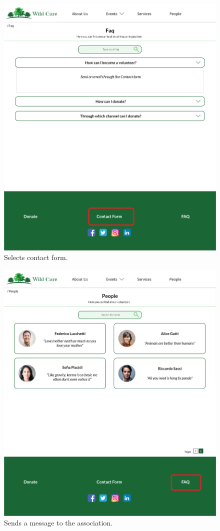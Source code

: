 	\begin{figure}[h!]
		\centering
		\begin{minipage}[b]{1\textwidth}
    			\includegraphics[width=\textwidth]{./assets/mockups/faq_contactform.png}
			\caption{Selects contact form.}
		\end{minipage}
	\end{figure}

	\begin{figure}[h!]
		\centering
		\begin{minipage}[b]{1\textwidth}
    			\includegraphics[width=\textwidth]{./assets/mockups/people_faq.png}
			\caption{Sends a message to the association.}
		\end{minipage}
	\end{figure}
